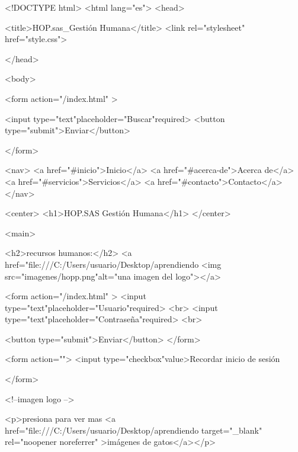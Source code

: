 <!DOCTYPE html>
<html lang="es">
    <head>

      <title>HOP.sas_Gestión Humana</title>
       <link rel="stylesheet" href="style.css">

       
    </head>
    
    












    
    <body>

      
      <form action="/index.html" >
        
        <input type="text"placeholder="Buscar"required>
        <button type="submit">Enviar</button>

      </form>


      

      <nav>
        <a href="#inicio">Inicio</a>
        <a href="#acerca-de">Acerca de</a>
        <a href="#servicios">Servicios</a>
        <a href="#contacto">Contacto</a>
    </nav>









      <center>
        <h1>HOP.SAS Gestión Humana</h1>
      </center>

        <main> 

         <h2>recursos humanos:</h2>
         <a href="file:///C:/Users/usuario/Desktop/aprendiendo%
         <img src="imagenes/hopp.png"alt="una imagen del logo"></a>



         <form action="/index.html" >
          <input type="text"placeholder="Usuario"required>
          <br>
          <input type="text"placeholder="Contraseña"required>
          <br>

          <button type="submit">Enviar</button>
        </form>


        <form action="">
          <input type="checkbox"value>Recordar inicio de sesión


        </form>



          <!--imagen logo --> 

          <p>presiona para ver mas
             <a href="file:///C:/Users/usuario/Desktop/aprendiendo%
             target="_blank" 
             rel="noopener noreferrer" 
             >imágenes de gatos</a></p>
          
